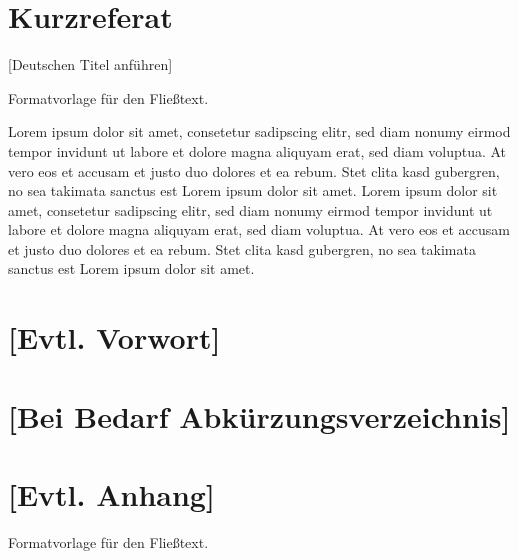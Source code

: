 \documentclass[a4paper,12pt]{scrreprt}
\begin{document}
\newpage
\chapter*{Kurzreferat}
[Deutschen Titel anführen]

Formatvorlage für den Fließtext.

Lorem ipsum dolor sit amet, consetetur sadipscing elitr, sed diam nonumy
eirmod tempor invidunt ut labore et dolore magna aliquyam erat, sed diam
voluptua. At vero eos et accusam et justo duo dolores et ea rebum. Stet
clita kasd gubergren, no sea takimata sanctus est Lorem ipsum dolor sit
amet. Lorem ipsum dolor sit amet, consetetur sadipscing elitr, sed diam
nonumy eirmod tempor invidunt ut labore et dolore magna aliquyam erat, sed
diam voluptua. At vero eos et accusam et justo duo dolores et ea rebum.
Stet clita kasd gubergren, no sea takimata sanctus est Lorem ipsum dolor
sit amet.


\newpage
\chapter*{[Evtl. Vorwort]}

\tableofcontents

\clearpage
{}
{}
\listoffigures

\clearpage
{}
{}
\listoftables


\newpage
\chapter*{[Bei Bedarf Abkürzungsverzeichnis]}
\begin{acronym}[SQL]
\end{acronym}



% 
% 
% 
% 

\clearpage
{}
{}


\chapter*{[Evtl. Anhang]}
Formatvorlage für den Fließtext.
\end{document}
